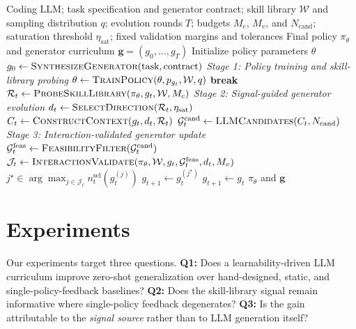 \documentclass[conference]{IEEEtran}
\begin{document}
\begin{algorithm}[H]
\caption{SCOPE Coevolution Procedure}
\label{alg:scope}
\small
\begin{algorithmic}[1]
\Require Coding LLM; task specification and generator contract; skill library
$\mathcal W$ and sampling distribution $q$; evolution rounds $T$; budgets
$M_c$, $M_v$, and $N_{\mathrm{cand}}$; saturation threshold
$\eta_{\mathrm{sat}}$; fixed validation margins and tolerances
\Ensure Final policy $\pi_\theta$ and generator curriculum
$\mathbf g=(g_0,\ldots,g_T)$
\State Initialize policy parameters $\theta$
\State $g_0 \gets \Call{SynthesizeGenerator}{\text{task},\text{contract}}$
    \Statex \textit{Stage 1: Policy training and skill-library probing}
    \State $\theta \gets
    \Call{TrainPolicy}{\theta,p_{g_t},\mathcal W,q}$
        \State \textbf{break}
    \EndIf
    \State $\mathcal R_t \gets
    \Call{ProbeSkillLibrary}{\pi_\theta,g_t,\mathcal W,M_c}$
    \Statex \textit{Stage 2: Signal-guided generator evolution}
    \State $d_t \gets
    \Call{SelectDirection}{\mathcal R_t,\eta_{\mathrm{sat}}}$
    \State $C_t \gets
    \Call{ConstructContext}{g_t,d_t,\mathcal R_t}$
    \State $\mathcal G_t^{\mathrm{cand}} \gets
    \Call{LLMCandidates}{C_t,N_{\mathrm{cand}}}$
    \Statex \textit{Stage 3: Interaction-validated generator update}
    \State $\mathcal G_t^{\mathrm{feas}} \gets
    \Call{FeasibilityFilter}{\mathcal G_t^{\mathrm{cand}}}$
    \State $\mathcal J_t \gets
    \Call{InteractionValidate}{\pi_\theta,\mathcal W,g_t,
    \mathcal G_t^{\mathrm{feas}},d_t,M_v}$
        \State $j^\star\in
        \arg\max_{j\in\mathcal J_t}
        n_t^{\mathrm{sel}}(g_t^{(j)})$
        \State $g_{t+1}\gets g_t^{(j^\star)}$
    \Else
        \State $g_{t+1}\gets g_t$
    \EndIf
\EndFor
\State \Return $\pi_\theta$ and $\mathbf g$
\end{algorithmic}
\end{algorithm}

\section{Experiments}
\label{sec:exp}
Our experiments target three questions. \textbf{Q1:} Does a learnability-driven
LLM curriculum improve zero-shot generalization over hand-designed, static, and
single-policy-feedback baselines? \textbf{Q2:} Does the skill-library signal
remain informative where single-policy feedback degenerates? \textbf{Q3:} Is the
gain attributable to the \emph{signal source} rather than to LLM generation
itself?
\end{document}
